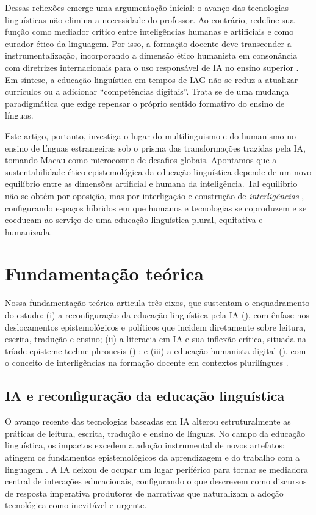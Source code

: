 \documentclass[portuguese]{textolivre}
\begin{document}
Dessas reflexões emerge uma argumentação inicial: o avanço das tecnologias linguísticas não elimina a necessidade do professor. Ao contrário, redefine sua função como mediador crítico entre inteligências humanas e artificiais e como curador ético da linguagem. Por isso, a formação docente deve transcender a instrumentalização, incorporando a dimensão ético humanista em consonância com diretrizes internacionais para o uso responsável de IA no ensino superior \cite{UNESCO2023}. Em síntese, a educação linguística em tempos de IAG não se reduz a atualizar currículos ou a adicionar “competências digitais”. Trata se de uma mudança paradigmática que exige repensar o próprio sentido formativo do ensino de línguas.

Este artigo, portanto, investiga o lugar do multilinguismo e do humanismo no ensino de línguas estrangeiras sob o prisma das transformações trazidas pela IA, tomando Macau como microcosmo de desafios globais. Apontamos que a sustentabilidade ético epistemológica da educação linguística depende de um novo equilíbrio entre as dimensões artificial e humana da inteligência. Tal equilíbrio não se obtém por oposição, mas por interligação e construção de \textit{interligências} \cite{PiresAmaro2025}, configurando espaços híbridos em que humanos e tecnologias se coproduzem e se coeducam ao serviço de uma educação linguística plural, equitativa e humanizada.



\section{Fundamentação teórica}\label{sec-teo}
Nossa fundamentação teórica articula três eixos, que sustentam o enquadramento do estudo: (i) a reconfiguração da educação linguística pela IA (), com ênfase nos deslocamentos epistemológicos e políticos que incidem diretamente sobre leitura, escrita, tradução e ensino; (ii) a literacia em IA e sua inflexão crítica, situada na tríade episteme-techne-phronesis () \cite{SperlingEtAl2024}; e (iii) a educação humanista digital (), com o conceito de interligências na formação docente em contextos plurilíngues \cite{PiresAmaro2025}.

\subsection{IA e reconfiguração da educação linguística}\label{sec-rec}

O avanço recente das tecnologias baseadas em IA alterou estruturalmente as práticas de leitura, escrita, tradução e ensino de línguas. No campo da educação linguística, os impactos excedem a adoção instrumental de novos artefatos: atingem os fundamentos epistemológicos da aprendizagem e do trabalho com a linguagem \cite{ZawackiRichterEtAl2019}. A IA deixou de ocupar um lugar periférico para tornar se mediadora central de interações educacionais, configurando o que \textcite{BearmanRyanAjjawi2023} descrevem como discursos de resposta imperativa produtores de narrativas que naturalizam a adoção tecnológica como inevitável e urgente.
\end{document}
